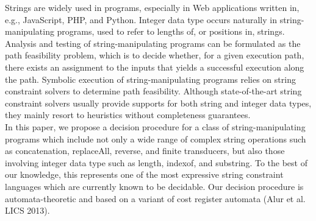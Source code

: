 
Strings are widely used in programs, especially in Web applications written in, e.g., JavaScript, PHP, and Python. Integer data type occurs naturally in string-manipulating programs, used to refer to lengths of, or positions in, strings. 
Analysis and testing of string-manipulating programs can be formulated as the path feasibility problem, which is to decide whether,  
for a given execution path, there exists an assignment to the inputs that yields a successful execution along the path. 
Symbolic execution of string-manipulating programs relies on string constraint solvers to determine  path feasibility.
Although state-of-the-art string constraint solvers usually provide supports for both string and integer data types,   
they mainly resort to heuristics without completeness guarantees. \\ %
%
In this paper, we propose a decision procedure 
for a class of string-manipulating programs
which include  not only a wide range of complex string operations such as concatenation, replaceAll, reverse, and finite transducers, but also those involving integer data type such as length, indexof, and substring. To the best of our knowledge, this represents one of the most expressive string constraint languages which are currently known to be decidable.  Our decision procedure is automata-theoretic and based on a variant of cost register automata (Alur et al. LICS 2013). 
